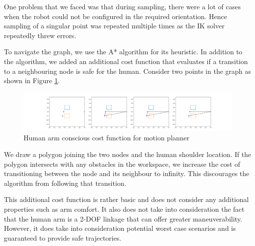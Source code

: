 One problem that we faced was that during sampling, there were a lot of cases when the robot could not be configured in the required orientation. 
Hence sampling of a singular point was repeated multiple times as the IK solver repeatedly threw errors. 

To navigate the graph, we use the A* algorithm for its heuristic. 
In addition to the algorithm, we added an additional cost function that evaluates if a transition to a neighbouring node is safe for the human. 
Consider two points in the graph as shown in Figure \ref{fig:humanArmConscious}. 
\begin{figure}[htpb]
  \centering
\includegraphics[width = \textwidth]{img/humanArmConscious.png}
  \caption{Human arm conscious cost function for motion planner}
  \label{fig:humanArmConscious}
\end{figure}
We draw a polygon joining the two nodes and the human shoulder location. 
If the polygon intersects with any obstacles in the workspace, we increase the cost of transitioning between the node and its neighbour to infinity. 
This discourages the algorithm from following that transition. 

This additional cost function is rather basic and does not consider any additional properties such as arm comfort. 
It also does not take into consideration the fact that the human arm is a 2-DOF linkage that can offer greater maneuverability. 
However, it does take into consideration potential worst case scenarios and is guaranteed to provide safe trajectories. 



